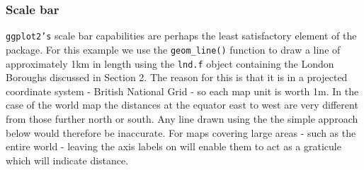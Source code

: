 \documentclass[]{article}
\begin{document}
\subsubsection{Scale bar}

\texttt{ggplot2's} scale bar capabilities are perhaps the least
satisfactory element of the package. For this example we use the
\texttt{geom\_line()} function to draw a line of approximately 1km in
length using the \texttt{lnd.f} object containing the London Boroughs
discussed in Section 2. The reason for this is that it is in a projected
coordinate system - British National Grid - so each map unit is worth
1m. In the case of the world map the distances at the equator east to
west are very different from those further north or south. Any line
drawn using the the simple approach below would therefore be inaccurate.
For maps covering large areas - such as the entire world - leaving the
axis labels on will enable them to act as a graticule which will
indicate distance.
\end{document}
